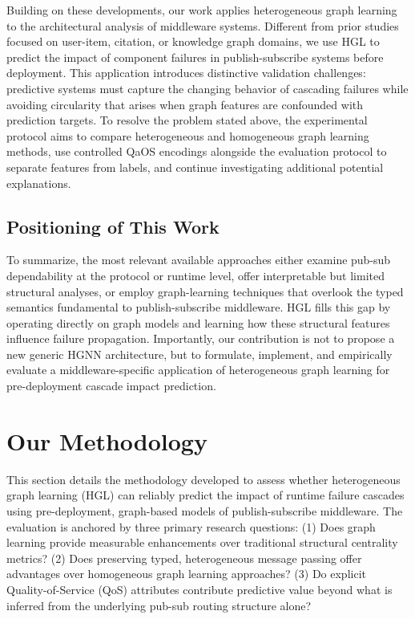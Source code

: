 \documentclass[sigconf,9pt,anonymous]{acmart}
\begin{document}
Building on these developments, our work applies heterogeneous graph learning to the architectural analysis of middleware systems. Different from prior studies focused on user-item, citation, or knowledge graph domains, we use HGL to predict the impact of component failures in publish-subscribe systems before deployment. This application introduces distinctive validation challenges: predictive systems must capture the changing behavior of cascading failures while avoiding circularity that arises when graph features are confounded with prediction targets. To resolve the problem stated above, the experimental protocol aims to compare heterogeneous and homogeneous graph learning methods, use controlled QaOS encodings alongside the evaluation protocol to separate features from labels, and continue investigating additional potential explanations.

\subsection{Positioning of This Work}

To summarize, the most relevant available approaches either examine pub-sub dependability at the protocol or runtime level, offer interpretable but limited structural analyses, or employ graph-learning techniques that overlook the typed semantics fundamental to publish-subscribe middleware. HGL fills this gap by operating directly on graph models and learning how these structural features influence failure propagation. Importantly, our contribution is not to propose a new generic HGNN architecture, but to formulate, implement, and empirically evaluate a middleware-specific application of heterogeneous graph learning for pre-deployment cascade impact prediction.

\section{Our Methodology}

This section details the methodology developed to assess whether heterogeneous graph learning (HGL) can reliably predict the impact of runtime failure cascades using pre-deployment, graph-based models of publish-subscribe middleware. The evaluation is anchored by three primary research questions: (1) Does graph learning provide measurable enhancements over traditional structural centrality metrics? (2) Does preserving typed, heterogeneous message passing offer advantages over homogeneous graph learning approaches? (3) Do explicit Quality-of-Service (QoS) attributes contribute predictive value beyond what is inferred from the underlying pub-sub routing structure alone?
\end{document}
